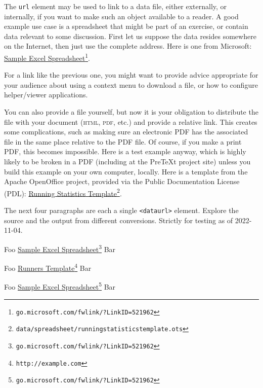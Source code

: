 \documentclass{amsart}
\theoremstyle{plain}%
\theoremstyle{definition}%
\theoremstyle{remark}%
\newcommand{\mono}[1]{\texttt{#1}}
\newcommand{\initialism}[1]{\textsc{\MakeLowercase{#1}}}
\numberwithin{equation}{section}
\begin{document}
The \mono{url} element may be used to link to a data file, either externally, or internally, if you want to make such an object available to a reader.  A good example use case is a spreadsheet that might be part of an exercise, or contain data relevant to some discussion.  First let us suppose the data resides somewhere on the Internet, then just use the complete address.  Here is one from Microsoft: \href{http://go.microsoft.com/fwlink/?LinkID=521962}{Sample Excel Spreadsheet}\footnote{\nolinkurl{go.microsoft.com/fwlink/?LinkID=521962}\label{section-cross-referencing-16-5}}.%
\par
For a link like the previous one, you might want to provide advice appropriate for your audience about using a context menu to download a file, or how to configure helper\slash{}viewer applications.%
\par
You can also provide a file yourself, but now it is your obligation to distribute the file with your document (\initialism{HTML}, \initialism{PDF}, etc.\@) and provide a relative link.  This creates some complications, such as making sure an electronic PDF has the associated file in the same place relative to the PDF file.  Of course, if you make a print PDF, this becomes impossible.  Here is a test example anyway, which is highly likely to be broken in a PDF (including at the PreTeXt project site) unless you build this example on your own computer, locally.  Here is a template from the Apache OpenOffice project, provided via the Public Documentation License (PDL):  \href{data/spreadsheet/runningstatisticstemplate.ots}{Running Statistics Template}\footnote{\nolinkurl{data/spreadsheet/runningstatisticstemplate.ots}\label{section-cross-referencing-18-6}}.%
\par
The next four paragraphs are each a single \mono{<dataurl>} element.  Explore the source and the output from different conversions.  Strictly for testing as of 2022-11-04.%
\par
Foo \href{http://go.microsoft.com/fwlink/?LinkID=521962}{Sample Excel Spreadsheet}\footnote{\nolinkurl{go.microsoft.com/fwlink/?LinkID=521962}\label{section-cross-referencing-20-2}} Bar%
\par
Foo \href{https://pretextbook.org/examples/sample-article/html/external/data/spreadsheet/runningstatisticstemplate.ots}{Runners Template}\footnote{\nolinkurl{http://example.com}\label{section-cross-referencing-21-2}} Bar%
\par
Foo \href{http://go.microsoft.com/fwlink/?LinkID=521962}{Sample Excel Spreadsheet}\footnote{\nolinkurl{go.microsoft.com/fwlink/?LinkID=521962}\label{section-cross-referencing-22-2}} Bar%
\end{document}
